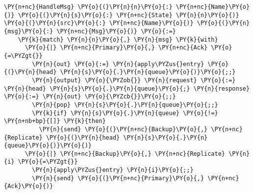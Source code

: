 \begin{Verbatim}[commandchars=\\\{\},codes={\catcode`\$=3\catcode`\^=7\catcode`\_=8}]
  \PY{n+nc}{HandleMsg} \PY{o}{(}\PY{n}{n}\PY{o}{:} \PY{n+nc}{Name}\PY{o}{)} \PY{o}{(}\PY{n}{s}\PY{o}{:} \PY{n+nc}{State} \PY{n}{n}\PY{o}{)} \PY{o}{(}\PY{n}{src}\PY{o}{:} \PY{n+nc}{Name}\PY{o}{)} \PY{o}{(}\PY{n}{msg}\PY{o}{:} \PY{n+nc}{Msg}\PY{o}{)} \PY{o}{:=}
    \PY{k}{match} \PY{n}{n}\PY{o}{,} \PY{n}{msg} \PY{k}{with}
      \PY{o}{|} \PY{n+nc}{Primary}\PY{o}{,} \PY{n+nc}{Ack} \PY{o}{=\PYZgt{}}
        \PY{n}{out} \PY{o}{:=} \PY{n}{apply\PYZus{}entry} \PY{o}{(}\PY{n}{head} \PY{n}{s}\PY{o}{.}\PY{n}{queue}\PY{o}{)}\PY{o}{;;}
        \PY{n}{output} \PY{o}{\PYZob{}} \PY{n}{request} \PY{o}{:=} \PY{n}{head} \PY{n}{s}\PY{o}{.}\PY{n}{queue}\PY{o}{;} \PY{n}{response} \PY{o}{:=} \PY{n}{out} \PY{o}{\PYZcb{}}\PY{o}{;;}
        \PY{n}{pop} \PY{n}{s}\PY{o}{.}\PY{n}{queue}\PY{o}{;;}
        \PY{k}{if} \PY{n}{s}\PY{o}{.}\PY{n}{queue} \PY{o}{!=} \PY{n+nb+bp}{[]} \PY{k}{then}
          \PY{n}{send} \PY{o}{(}\PY{n+nc}{Backup}\PY{o}{,} \PY{n+nc}{Replicate} \PY{o}{(}\PY{n}{head} \PY{n}{s}\PY{o}{.}\PY{n}{queue}\PY{o}{)}\PY{o}{)}
      \PY{o}{|} \PY{n+nc}{Backup}\PY{o}{,} \PY{n+nc}{Replicate} \PY{n}{i} \PY{o}{=\PYZgt{}}
        \PY{n}{apply\PYZus{}entry} \PY{n}{i}\PY{o}{;;}
        \PY{n}{send} \PY{o}{(}\PY{n+nc}{Primary}\PY{o}{,} \PY{n+nc}{Ack}\PY{o}{)}
\end{Verbatim}
